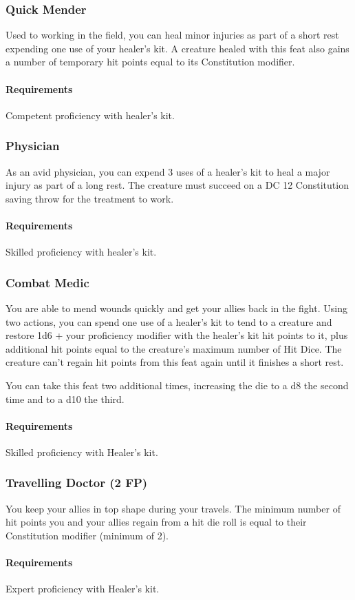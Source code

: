 \subsubsection{Quick Mender} \label{feat::quickmender}
    Used to working in the field, you can heal minor injuries as part of a short rest expending one use of your healer's kit.
    A creature healed with this feat also gains a number of temporary hit points equal to its Constitution modifier.
    \paragraph{Requirements} Competent proficiency with healer's kit.
\subsubsection{Physician} \label{feat::physician}
    As an avid physician, you can expend 3 uses of a healer's kit to heal a major injury as part of a long rest.
    The creature must succeed on a DC 12 Constitution saving throw for the treatment to work.
    \paragraph{Requirements} Skilled proficiency with healer's kit.
\subsubsection{Combat Medic} \label{feat::combatmedic}
    You are able to mend wounds quickly and get your allies back in the fight.
    Using two actions, you can spend one use of a healer's kit to tend to a creature and restore 1d6 + your proficiency modifier with the healer's kit hit points to it, plus additional hit points equal to the creature's maximum number of Hit Dice.
    The creature can't regain hit points from this feat again until it finishes a short rest.

    You can take this feat two additional times, increasing the die to a d8 the second time and to a d10 the third.
    \paragraph{Requirements} Skilled proficiency with Healer's kit.
\subsubsection{Travelling Doctor (2 FP)} \label{feat::travellingdoctor}
    You keep your allies in top shape during your travels.
    The minimum number of hit points you and your allies regain from a hit die roll is equal to their Constitution modifier (minimum of 2).
    \paragraph{Requirements} Expert proficiency with Healer's kit.
